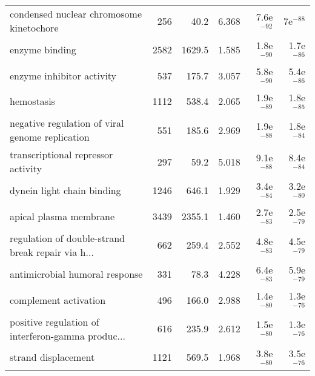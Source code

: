 \begin{longtable}{lrrrrr}
          condensed nuclear chromosome kinetochore &                     256 &                    40.2 &      6.368 &         7.6e$^{-92}$ &           7e$^{-88}$ \\
                                    enzyme binding &                    2582 &                  1629.5 &      1.585 &         1.8e$^{-90}$ &         1.7e$^{-86}$ \\
                         enzyme inhibitor activity &                     537 &                   175.7 &      3.057 &         5.8e$^{-90}$ &         5.4e$^{-86}$ \\
                                        hemostasis &                    1112 &                   538.4 &      2.065 &         1.9e$^{-89}$ &         1.8e$^{-85}$ \\
   negative regulation of viral genome replication &                     551 &                   185.6 &      2.969 &         1.9e$^{-88}$ &         1.8e$^{-84}$ \\
                transcriptional repressor activity &                     297 &                    59.2 &      5.018 &         9.1e$^{-88}$ &         8.4e$^{-84}$ \\
                        dynein light chain binding &                    1246 &                   646.1 &      1.929 &         3.4e$^{-84}$ &         3.2e$^{-80}$ \\
                            apical plasma membrane &                    3439 &                  2355.1 &      1.460 &         2.7e$^{-83}$ &         2.5e$^{-79}$ \\
 regulation of double-strand break repair via h... &                     662 &                   259.4 &      2.552 &         4.8e$^{-83}$ &         4.5e$^{-79}$ \\
                    antimicrobial humoral response &                     331 &                    78.3 &      4.228 &         6.4e$^{-83}$ &         5.9e$^{-79}$ \\
                             complement activation &                     496 &                   166.0 &      2.988 &         1.4e$^{-80}$ &         1.3e$^{-76}$ \\
 positive regulation of interferon-gamma produc... &                     616 &                   235.9 &      2.612 &         1.5e$^{-80}$ &         1.3e$^{-76}$ \\
                               strand displacement &                    1121 &                   569.5 &      1.968 &         3.8e$^{-80}$ &         3.5e$^{-76}$ \\

\end{longtable}
